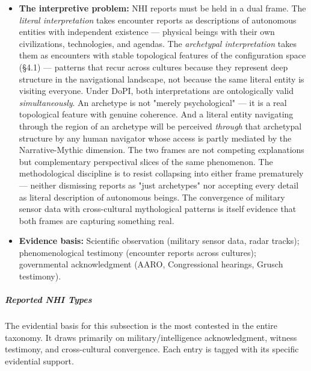\begin{itemize}[nosep,leftmargin=*]
  \item \textbf{The interpretive problem:} NHI reports must be held in a dual frame. The \textit{literal interpretation} takes encounter reports as descriptions of autonomous entities with independent existence — physical beings with their own civilizations, technologies, and agendas. The \textit{archetypal interpretation} takes them as encounters with stable topological features of the configuration space (§4.1) — patterns that recur across cultures because they represent deep structure in the navigational landscape, not because the same literal entity is visiting everyone. Under DoPI, both interpretations are ontologically valid \textit{simultaneously}. An archetype is not "merely psychological" — it is a real topological feature with genuine coherence. And a literal entity navigating through the region of an archetype will be perceived \textit{through} that archetypal structure by any human navigator whose access is partly mediated by the Narrative-Mythic dimension. The two frames are not competing explanations but complementary perspectival slices of the same phenomenon. The methodological discipline is to resist collapsing into either frame prematurely — neither dismissing reports as "just archetypes" nor accepting every detail as literal description of autonomous beings. The convergence of military sensor data with cross-cultural mythological patterns is itself evidence that both frames are capturing something real.
  \item \textbf{Evidence basis:} Scientific observation (military sensor data, radar tracks); phenomenological testimony (encounter reports across cultures); governmental acknowledgment (AARO, Congressional hearings, Grusch testimony).
\end{itemize}


\subparagraph*{Reported NHI Types}


The evidential basis for this subsection is the most contested in the entire taxonomy. It draws primarily on military/\allowbreak intelligence acknowledgment, witness testimony, and cross-cultural convergence. Each entry is tagged with its specific evidential support.


